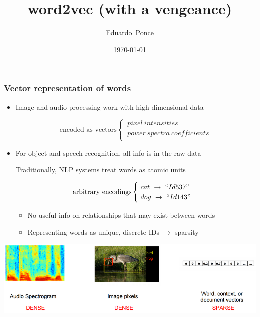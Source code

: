 \documentclass{beamer}   %
\title[word2vec]%
{word2vec (with a vengeance)}
\author[Authors]%
{Eduardo~Ponce}
\institute[IEEESoftware]%
{
  University of Tennessee, Knoxville \\
  COSC 690 - Evidence Engineering
}
\date{\today}
\begin{document}
 
\frame{\titlepage}


\begin{frame}[t]
\frametitle{Vector representation of words}
    \begin{itemize}
        \item Image and audio processing work with high-dimensional data \par
        \vspace{-0.5em} 
        \begin{equation*}
            \text{encoded as vectors}
            \begin{cases}
                \ pixel\ intensities \\
                \ power\ spectra\ coefficients \\
            \end{cases}
        \end{equation*}
        \par\vspace{0.5em} 
        \item For object and speech recognition, all info is in the raw data \par
        Traditionally, NLP systems treat words as atomic units \par
        \vspace{-0.5em} 
        \begin{equation*}
            \text{arbitrary encodings}
            \begin{cases}
                \ cat\ \rightarrow\ ``Id537" \\
                \ dog\ \rightarrow\ ``Id143" \\
            \end{cases}
        \end{equation*}
        \par\vspace{-0.5em} 
        \begin{itemize}
            \item No useful info on relationships that may exist between words
            \item Representing words as unique, discrete IDs $\rightarrow$ sparsity
        \end{itemize}
    \end{itemize}
    \vspace{0.3em} 
    \hspace{1cm}\includegraphics[scale=0.25]{pix_audio_text}
\end{frame}
\end{document}
